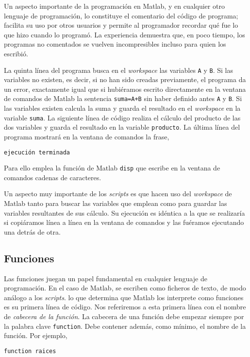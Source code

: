 Un aspecto importante de la programación en Matlab, y en cualquier otro lenguaje de programación, lo constituye el comentario del código de programa; facilita su uso por otros usuarios y permite al programador recordar qué fue lo que hizo cuando lo programó. La experiencia demuestra que, en poco tiempo, los programas no comentados se vuelven incompresibles incluso para quien los escribió.

La quinta línea del programa busca en el \emph{workspace} las variables \texttt{A} y \texttt{B}. Si las variables no existen, es decir, si no han sido creadas previamente, el programa da un error, exactamente igual que si hubiéramos escrito directamente en la ventana de comandos de Matlab la sentencia \texttt{suma=A+B} sin haber definido antes \texttt{A} y \texttt{B}. Si las variables existen calcula la suma y guarda el resultado en el \emph{workspace} en la variable \texttt{suma}. La siguiente línea de código realiza el cálculo del producto de las dos variables y guarda el resultado en la variable \texttt{producto}. La última línea del programa mostrará en la ventana de comandos la frase,

\begin{verbatim}
ejecución terminada
\end{verbatim}
Para ello emplea la función de Matlab \texttt{disp} que escribe en la ventana de comandos cadenas de caracteres.

Un aspecto muy importante de los \emph{scripts} es que hacen uso del \emph{workspace} de Matlab tanto para buscar las variables que emplean como para guardar las variables resultantes de sus cálculo. Su ejecución es idéntica a la que se realizaría si copiáramos línea a línea en la ventana de comandos y las fuéramos ejecutando una detrás de otra.

\subsection{Funciones} 
Las funciones juegan un papel fundamental en cualquier lenguaje de programación. En el caso de Matlab, se escriben como ficheros de texto, de modo análogo a los \emph{scripts}. lo que determina que Matlab los interprete como funciones es su primera línea de código.  Nos referiremos a esta primera línea con el nombre de \emph{cabecera de la función}. La cabecera de una función debe empezar siempre por la palabra clave \texttt{function}. Debe contener además, como mínimo, el nombre de la función. Por ejemplo,
\begin{verbatim}
function raices
\end{verbatim}

